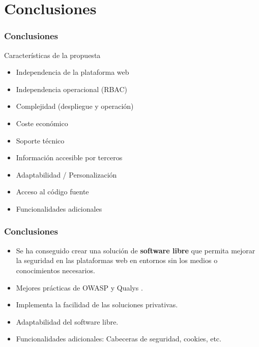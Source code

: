 \section{Conclusiones}
\begin{frame}[shrink]
  \frametitle{Conclusiones}
  \par Características de la propuesta
  \begin{itemize}
    \item \greencheck Independencia de la plataforma web    
    \item \greencheck Independencia operacional (RBAC)      
    \item \yellowcheck Complejidad (despliegue y operación) 
    \item \greencheck Coste económico                       
    \item \redcrossed Soporte técnico                       
    \item \greencheck Información accesible por terceros    
    \item \greencheck Adaptabilidad / Personalización       
    \item \greencheck Acceso al código fuente               
    \item \greencheck Funcionalidades adicionales           
  \end{itemize}
\end{frame}

\begin{frame}[shrink]
  \frametitle{Conclusiones}
  \begin{itemize}
    \item Se ha conseguido crear una solución de {\bf software libre} que permita mejorar la seguridad en las plataformas web en
      entornos sin los medios o conocimientos necesarios. \\
    \item Mejores prácticas de OWASP \cite{owaspbestpractices} y Qualys \cite{TLSBestPractices}. \\
    \item Implementa la facilidad de las soluciones privativas. \\
    \item Adaptabilidad del software libre. \\
    \item Funcionalidades adicionales: Cabeceras de seguridad, cookies, etc. \\
  \end{itemize}
\end{frame}


